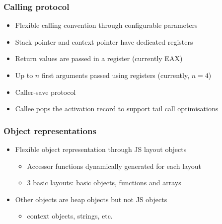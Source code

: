 \begin{frame}
\frametitle{\bf Calling protocol}

\begin{itemize}
    \item Flexible calling convention through configurable parameters
    \item Stack pointer and context pointer have dedicated registers
    \item Return values are passed in a register (currently EAX)
    \item Up to $n$ first arguments passed using registers (currently, $n =
    4$)
    \item Caller-save protocol
    \item Callee pops the activation record to support tail call optimisations
\end{itemize}
\end{frame}

\begin{frame}
\frametitle{\bf Object representations}

\begin{itemize}
    \item Flexible object representation through JS layout objects
    \begin{itemize}
        \item Accessor functions dynamically generated for each layout
        \item 3 basic layouts: basic objects, functions and arrays
    \end{itemize}
    \item Other objects are heap objects but not JS objects
    \begin{itemize}
        \item context objects, strings, etc.
    \end{itemize}
\end{itemize}



\end{frame}

